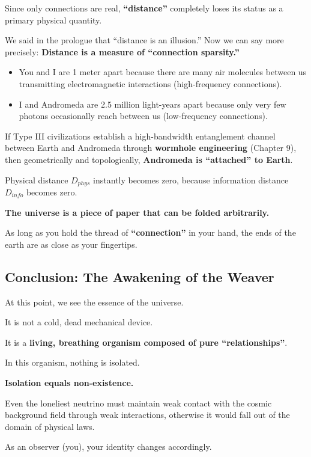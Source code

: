Since only connections are real, \textbf{``distance''} completely loses its status as a primary physical quantity.

We said in the prologue that ``distance is an illusion.'' Now we can say more precisely: \textbf{Distance is a measure of ``connection sparsity.''}

\begin{itemize}
\item You and I are 1 meter apart because there are many air molecules between us transmitting electromagnetic interactions (high-frequency connections).

\item I and Andromeda are 2.5 million light-years apart because only very few photons occasionally reach between us (low-frequency connections).
\end{itemize}

If Type III civilizations establish a high-bandwidth entanglement channel between Earth and Andromeda through \textbf{wormhole engineering} (Chapter 9), then geometrically and topologically, \textbf{Andromeda is ``attached'' to Earth}.

Physical distance $D_{phys}$ instantly becomes zero, because information distance $D_{info}$ becomes zero.

\textbf{The universe is a piece of paper that can be folded arbitrarily.}

As long as you hold the thread of \textbf{``connection''} in your hand, the ends of the earth are as close as your fingertips.

\subsection{Conclusion: The Awakening of the Weaver}

At this point, we see the essence of the universe.

It is not a cold, dead mechanical device.

It is a \textbf{living, breathing organism composed of pure ``relationships''}.

In this organism, nothing is isolated.

\textbf{Isolation equals non-existence.}

Even the loneliest neutrino must maintain weak contact with the cosmic background field through weak interactions, otherwise it would fall out of the domain of physical laws.

As an observer (you), your identity changes accordingly.

